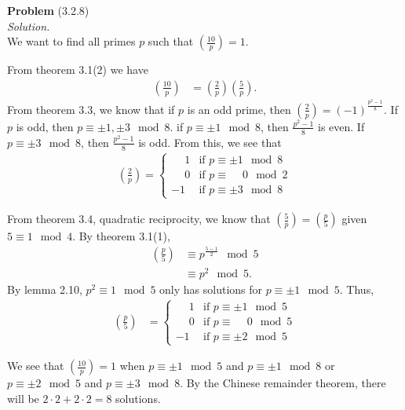\documentclass[12 pt]{amsart}
\begin{document}
\phantom{\quad} \vfill
\noindent
\textbf{Problem} (3.2.8) \\[4ex]
\emph{Solution.} \\[2ex]
  We want to find all primes $p$ such that 
  $\left( \frac{10}{p} \right) = 1$.

  From theorem 3.1(2) we have
  \begin{align*}
    \left( \frac{10}{p} \right)  
    &=
      \left( \frac{2}{p} \right)  
      \left( \frac{5}{p} \right).   
  \end{align*}
  From theorem 3.3, we know that
  if $p$ is an odd prime, then
  $\left( \frac{2}{p} \right) = (-1)^{\frac{p^2-1}{8}}$.
  If $p$ is odd, then $p \equiv \pm 1, \pm 3 \mod 8$.
  if $p \equiv \pm 1 \mod 8$, then $\frac{p^2-1}{8}$ is even.
  If $p \equiv \pm 3 \mod 8$, then $\frac{p^2 - 1}{8}$ is odd.
  From this, we see that
  \begin{align*}
    \left( \frac{2}{p} \right)
    =
    \begin{cases}
      \phantom{-} 1 & \text{if $p \equiv \pm 1 \mod 8$} \\
      \phantom{-} 0 & \text{if $p \equiv \phantom{\pm}0 \mod 2$} \\
      -1 & \text{if $p \equiv \pm 3 \mod 8$} 
    \end{cases}
  \end{align*}

  From theorem 3.4, quadratic reciprocity, we know that 
  $\left( \frac{5}{p} \right) = 
   \left( \frac{p}{5} \right)$
   given $5 \equiv 1 \mod 4$.
  By theorem 3.1(1), 
  \begin{align*}
    \left( \frac{p}{5} \right)
    &\equiv
      p^{\frac{5-1}{2}}  \mod 5 \\
    &\equiv
      p^2 \mod 5.
  \end{align*}
  By lemma 2.10, 
  $p^2 \equiv 1 \mod 5$
  only has solutions for
  $p \equiv \pm 1 \mod 5$.
  Thus, 
  \begin{align*}
    \left( \frac{p}{5} \right)
    &=
      \begin{cases}
        \phantom{-} 1 & \text{if $p \equiv \pm 1 \mod 5$} \\
        \phantom{-} 0 & \text{if $p \equiv \phantom{\pm}0 \mod 5$} \\
        -1 & \text{if $p \equiv \pm 2 \mod 5$}
      \end{cases}
  \end{align*}
  
  We see that 
  $\left( \frac{10}{p} \right) = 1$
  when 
  $p \equiv \pm 1 \mod 5$
  and
  $p \equiv \pm 1 \mod 8$
  or
  $p \equiv \pm 2 \mod 5$
  and
  $p \equiv \pm 3 \mod 8$.
  By the Chinese remainder theorem, there will be
  $2 \cdot 2 + 2 \cdot 2 = 8$ solutions.
\end{document}

